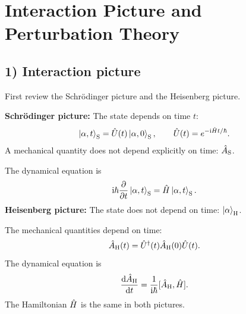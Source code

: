 \section{Interaction Picture and Perturbation Theory}
\subsection*{1) Interaction picture}
First review the Schr\"odinger picture and the Heisenberg picture.

\textbf{Schr\"odinger picture:}
The state depends on time $t$:
\begin{equation}
 \left|\alpha,t\right\rangle_{\mathrm S}=\hat{U}(t)\left|\alpha,0\right\rangle_{\mathrm S},
 \qquad \hat{U}(t)=e^{-\mathrm{i}\hat{H}t/\hbar}.
\end{equation}
A mechanical quantity does not depend explicitly on time: $\hat{A}_{\mathrm S}$.

The dynamical equation is
\begin{equation}
 \mathrm{i}\hbar\frac{\partial}{\partial t}\left|\alpha,t\right\rangle_{\mathrm S}
 =\hat{H}\left|\alpha,t\right\rangle_{\mathrm S}.
\end{equation}
\textbf{Heisenberg picture:}
The state does not depend on time: $\left|\alpha\right\rangle_{\mathrm H}$.

The mechanical quantities depend on time:
\begin{equation}
 \hat{A}_{\mathrm H}(t)=\hat{U}^\dagger(t)\hat{A}_{\mathrm H}(0)\hat{U}(t).
\end{equation}
The dynamical equation is
\begin{equation}
 \frac{\mathrm{d}\hat{A}_{\mathrm H}}{\mathrm{d} t}
 =\frac1{\mathrm{i}\hbar}[\hat{A}_{\mathrm H},\hat{H}].
\end{equation}
The Hamiltonian $\hat{H}$ is the same in both pictures.

